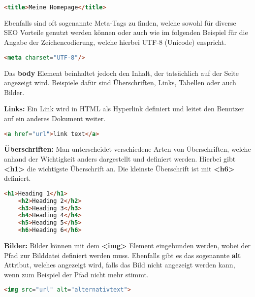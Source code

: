 \begin{lstlisting}[language=html]
    <title>Meine Homepage</title>
\end{lstlisting}

Ebenfalls sind oft sogenannte Meta-Tags zu finden, welche sowohl für diverse SEO Vorteile genutzt werden können oder auch wie im folgenden Beispiel für die Angabe der Zeichencodierung, welche hierbei UTF-8 (Unicode) enspricht.

\begin{lstlisting}[language=html]
    <meta charset="UTF-8"/>
\end{lstlisting}

Das \textbf{body} Element beinhaltet jedoch den Inhalt, der tatsächlich auf der Seite angezeigt wird. Beispiele dafür sind Überschriften, Links, Tabellen oder auch Bilder.

\cite{frontend_web_html}

\textbf{Links:}
\newline
Ein Link wird in HTML als Hyperlink definiert und leitet den Benutzer auf ein anderes Dokument weiter.

\begin{lstlisting}[language=html]
    <a href="url">link text</a>
\end{lstlisting}

\cite{frontend_web_html_links}

\textbf{Überschriften:}
\newline
Man unterscheidet verschiedene Arten von Überschriften, welche anhand der Wichtigkeit anders dargestellt und definiert werden. Hierbei gibt \textbf{<h1>} die wichtigste Überschrift an. Die kleinste Überschrift ist mit \textbf{<h6>} definiert.

\begin{lstlisting}[language=html]
    <h1>Heading 1</h1>
    <h2>Heading 2</h2>
    <h3>Heading 3</h3>
    <h4>Heading 4</h4>
    <h5>Heading 5</h5>
    <h6>Heading 6</h6>
\end{lstlisting}

\cite{frontend_web_html_überschriften}

\textbf{Bilder:}
\newline
Bilder können mit dem \textbf{<img>} Element eingebunden werden, wobei der Pfad zur Bilddatei definiert werden muss. Ebenfalls gibt es das sogenannte \textbf{alt} Attribut, welches angezeigt wird, falls das Bild nicht angezeigt werden kann, wenn zum Beispiel der Pfad nicht mehr stimmt.

\begin{lstlisting}[language=html]
    <img src="url" alt="alternativtext">
\end{lstlisting}




